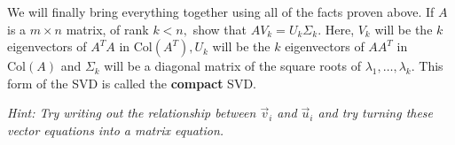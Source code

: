 \begin{enumerate}

\qitem We will finally bring everything together using all of the facts proven above. 
  If $A$ is a $m \times n$ matrix, of rank $k < n,$ show that $AV_{k} = U_{k} \Sigma_{k}.$ 
  Here, $V_{k}$ will be the $k$ eigenvectors of $A^{T}A$ in $\text{Col}(A^{T}), U_{k}$ will be the $k$ eigenvectors of $AA^{T}$ in $\text{Col}(A)$ and $\Sigma_{k}$ will be a diagonal matrix of the square roots of $\lambda_{1}, \dotsc, \lambda_{k}.$ 
  This form of the SVD is called the \textbf{compact} SVD.

  \textit{Hint: Try writing out the relationship between $\vec{v}_{i}$ and $\vec{u}_{i}$ and try turning these vector equations into a matrix equation.}


\end{enumerate}
